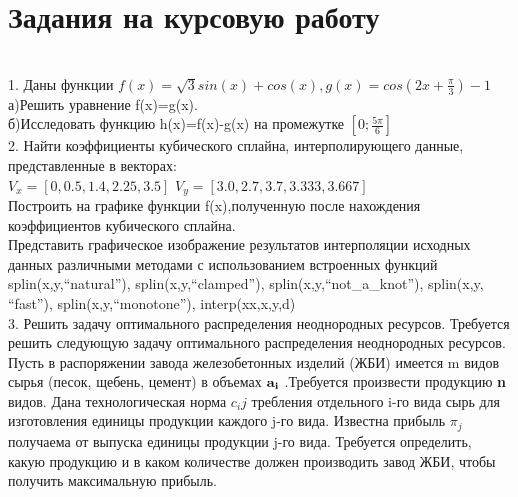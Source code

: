 \documentclass[russian,utf8,nocolumnxxxi,nocolumnxxxii]{eskdtext}
\begin{document}
\newpage
\section{Задания на курсовую работу}
\\1. Даны функции $f(x)=\sqrt{3}sin(x)+cos(x),g(x)=cos(2x+\frac{\pi}{3})-1$
\\а)Решить уравнение f(x)=g(x).
\\б)Исследовать функцию h(x)=f(x)-g(x) на промежутке $[0;\frac{5\pi}{6}]$
\\2. Найти коэффициенты кубического сплайна, интерполирующего данные, представленные в векторах:\\
$V_{x}=[0,0.5,1.4,2.25,3.5]$
$V_{y}=[3.0,2.7,3.7,3.333,3.667]$\\
Построить на графике функции f(x),полученную после нахождения коэффициентов кубического сплайна. \\
Представить графическое изображение результатов интерполяции исходных данных различными методами с использованием встроенных функций
\\splin(x,y,“natural”), splin(x,y,“clamped”), splin(x,y,“not\_a\_knot”), splin(x,y, “fast”), splin(x,y,“monotone”), interp(xx,x,y,d)\\
3. Решить задачу оптимального распределения неоднородных ресурсов.
Требуется решить следующую задачу оптимального распределения неоднородных ресурсов. Пусть в распоряжении завода железобетонных изделий (ЖБИ) имеется m видов сырья (песок, щебень, цемент) в объемах ${\bf a_i}$ .Требуется произвести продукцию {\bf n} видов. Дана технологическая норма $c_ij$ требления отдельного i-го вида сырь для изготовления единицы продукции каждого j-го вида. Известна прибыль $\pi_j$ получаема от выпуска единицы продукции j-го вида. Требуется определить, какую продукцию и в каком количестве должен производить завод ЖБИ, чтобы получить максимальную прибыль.
\begin{center}
\begin{minipage}[h]{0.65\linewidth}
 \\
\end{minipage}
\end{center}

\newpage
\end{document}
